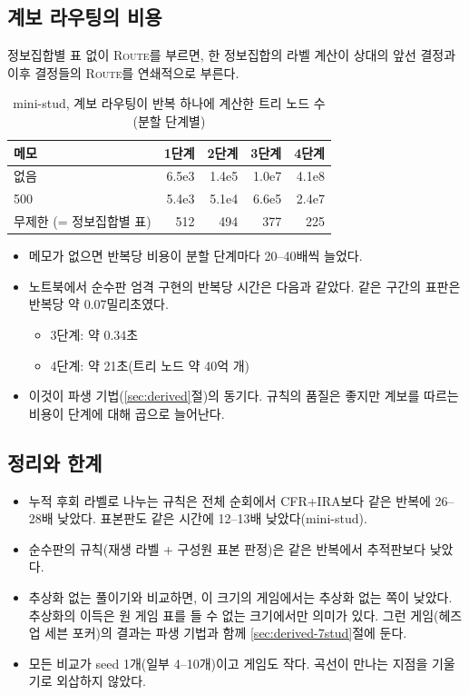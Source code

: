 \subsection{계보 라우팅의 비용}\label{sec:exp-route}
정보집합별 표 없이 \textsc{Route}를 부르면, 한 정보집합의 라벨 계산이 상대의 앞선 결정과 이후 결정들의 \textsc{Route}를 연쇄적으로 부른다.
\begin{table}[h]
\centering\small
\caption{mini-stud, 계보 라우팅이 반복 하나에 계산한 트리 노드 수(분할 단계별)}\label{tab:route}
\begin{tabular}{@{}lrrrr@{}}
\toprule
메모 & 1단계 & 2단계 & 3단계 & 4단계 \\
\midrule
없음 & 6.5e3 & 1.4e5 & 1.0e7 & 4.1e8 \\
500 & 5.4e3 & 5.1e4 & 6.6e5 & 2.4e7 \\
무제한 (= 정보집합별 표) & 512 & 494 & 377 & 225 \\
\bottomrule
\end{tabular}
\end{table}
\begin{itemize}
  \item 메모가 없으면 반복당 비용이 분할 단계마다 20–40배씩 늘었다.
  \item 노트북에서 순수판 엄격 구현의 반복당 시간은 다음과 같았다. 같은 구간의 표판은 반복당 약 0.07밀리초였다.
    \begin{itemize}
      \item 3단계: 약 0.34초
      \item 4단계: 약 21초(트리 노드 약 40억 개)
    \end{itemize}
  \item 이것이 파생 기법(\ref{sec:derived}절)의 동기다. 규칙의 품질은 좋지만 계보를 따르는 비용이 단계에 대해 곱으로 늘어난다.
\end{itemize}

\subsection{정리와 한계}
\begin{itemize}
  \item 누적 후회 라벨로 나누는 규칙은 전체 순회에서 CFR+IRA보다 같은 반복에 26–28배 낮았다. 표본판도 같은 시간에 12–13배 낮았다(mini-stud).
  \item 순수판의 규칙(재생 라벨 + 구성원 표본 판정)은 같은 반복에서 추적판보다 낮았다.
  \item 추상화 없는 풀이기와 비교하면, 이 크기의 게임에서는 추상화 없는 쪽이 낮았다. 추상화의 이득은 원 게임 표를 들 수 없는 크기에서만 의미가 있다. 그런 게임(헤즈업 세븐 포커)의 결과는 파생 기법과 함께 \ref{sec:derived-7stud}절에 둔다.
  \item 모든 비교가 seed 1개(일부 4–10개)이고 게임도 작다. 곡선이 만나는 지점을 기울기로 외삽하지 않았다.
\end{itemize}
